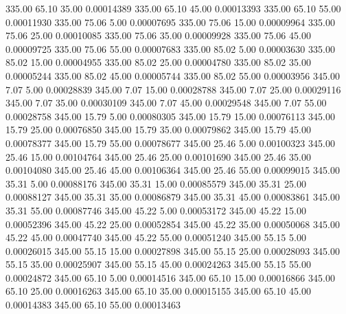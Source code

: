     335.00     65.10     35.00     0.00014389
    335.00     65.10     45.00     0.00013393
    335.00     65.10     55.00     0.00011930
    335.00     75.06      5.00     0.00007695
    335.00     75.06     15.00     0.00009964
    335.00     75.06     25.00     0.00010085
    335.00     75.06     35.00     0.00009928
    335.00     75.06     45.00     0.00009725
    335.00     75.06     55.00     0.00007683
    335.00     85.02      5.00     0.00003630
    335.00     85.02     15.00     0.00004955
    335.00     85.02     25.00     0.00004780
    335.00     85.02     35.00     0.00005244
    335.00     85.02     45.00     0.00005744
    335.00     85.02     55.00     0.00003956
    345.00      7.07      5.00     0.00028839
    345.00      7.07     15.00     0.00028788
    345.00      7.07     25.00     0.00029116
    345.00      7.07     35.00     0.00030109
    345.00      7.07     45.00     0.00029548
    345.00      7.07     55.00     0.00028758
    345.00     15.79      5.00     0.00080305
    345.00     15.79     15.00     0.00076113
    345.00     15.79     25.00     0.00076850
    345.00     15.79     35.00     0.00079862
    345.00     15.79     45.00     0.00078377
    345.00     15.79     55.00     0.00078677
    345.00     25.46      5.00     0.00100323
    345.00     25.46     15.00     0.00104764
    345.00     25.46     25.00     0.00101690
    345.00     25.46     35.00     0.00104080
    345.00     25.46     45.00     0.00106364
    345.00     25.46     55.00     0.00099015
    345.00     35.31      5.00     0.00088176
    345.00     35.31     15.00     0.00085579
    345.00     35.31     25.00     0.00088127
    345.00     35.31     35.00     0.00086879
    345.00     35.31     45.00     0.00083861
    345.00     35.31     55.00     0.00087746
    345.00     45.22      5.00     0.00053172
    345.00     45.22     15.00     0.00052396
    345.00     45.22     25.00     0.00052854
    345.00     45.22     35.00     0.00050068
    345.00     45.22     45.00     0.00047740
    345.00     45.22     55.00     0.00051240
    345.00     55.15      5.00     0.00026015
    345.00     55.15     15.00     0.00027898
    345.00     55.15     25.00     0.00028093
    345.00     55.15     35.00     0.00025907
    345.00     55.15     45.00     0.00024263
    345.00     55.15     55.00     0.00024872
    345.00     65.10      5.00     0.00014516
    345.00     65.10     15.00     0.00016866
    345.00     65.10     25.00     0.00016263
    345.00     65.10     35.00     0.00015155
    345.00     65.10     45.00     0.00014383
    345.00     65.10     55.00     0.00013463
